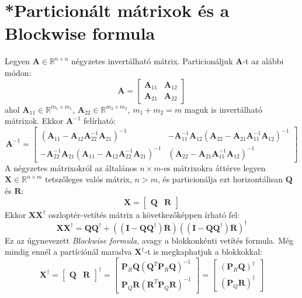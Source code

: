 \documentclass[14p]{report}
\def\pmb{\boldsymbol}
\newcounter{x}
\newcounter{y}
\newcounter{z}
\begin{document}
	\section{*Particionált mátrixok és a Blockwise formula}
	Legyen $\pmb{A} \in \mathbb{R}^{n \times n}$ négyzetes invertálható mátrix. Particionáljuk $\pmb{A}$-t az alábbi módon:
	\[
		\pmb{A} =
		\begin{bmatrix}
		\pmb{A}_{11} & \pmb{A}_{12} \\
		\pmb{A}_{21} & \pmb{A}_{22}
		\end{bmatrix}
	\]
	ahol $\pmb{A}_{11} \in \mathbb{R}^{m_1 \times m_1}$, $\pmb{A}_{22} \in \mathbb{R}^{m_2 \times m_2}$, $m_1 + m_2 = m$ maguk is invertálható mátrixok. Ekkor $\pmb{A}^{-1}$ felírható:
	\[
		\pmb{A}^{-1} = 
		\begin{bmatrix}
		(\pmb{A}_{11}-\pmb{A}_{12}\pmb{A}_{22}^{-1}\pmb{A}_{21})^{-1} & -\pmb{A}_{11}^{-1}\pmb{A}_{12}(\pmb{A}_{22}-\pmb{A}_{21}\pmb{A}_{11}^{-1}\pmb{A}_{12})^{-1} \\
		-\pmb{A}_{22}^{-1}\pmb{A}_{21}(\pmb{A}_{11}-\pmb{A}_{12}\pmb{A}_{22}^{-1}\pmb{A}_{21})^{-1} & (\pmb{A}_{22}-\pmb{A}_{21}\pmb{A}_{11}^{-1}\pmb{A}_{12})^{-1}
		\end{bmatrix}
	\]
	A négyzetes mátrixokról az általános $n \times m$-es mátrixokra áttérve legyen $\pmb{X} \in \mathbb{R}^{n \times m}$ tetszőleges valós mátrix, $n > m$, és particionálja ezt horizontálisan $\pmb{Q}$ és $\pmb{R}$:
	\[
		\pmb{X} = \begin{bmatrix}
				\pmb{Q} & \pmb{R}
		\end{bmatrix}
	\]
	Ekkor $\pmb{X}\pmb{X}^{\dagger}$ oszloptér-vetítés mátrix a következőképpen írható fel:
	\[
		\pmb{X}\pmb{X}^{\dagger} = \pmb{Q}\pmb{Q}^{\dagger} + ((\pmb{I}-\pmb{Q}\pmb{Q}^{\dagger})\pmb{R})((\pmb{I}-\pmb{Q}\pmb{Q}^{\dagger})\pmb{R})^{\dagger}
	\]
	Ez az úgynevezett \emph{Blockwise formula}, avagy a blokkonkénti vetítés formula. Még mindig ennél a partíciónál maradva $\pmb{X}^{\dagger}$-t is megkaphatjuk a blokkokkal:
	\[
		\pmb{X}^{\dagger} = 
		\begin{bmatrix}
		\pmb{Q} & \pmb{R}
		\end{bmatrix}^{\dagger} =
	\begin{bmatrix}
	\pmb{P}_{R}\pmb{Q}(\pmb{Q}^T\pmb{P}_{R}\pmb{Q})^{-1} \\
	\pmb{P}_{Q}\pmb{R}(\pmb{R}^T\pmb{P}_{Q}\pmb{R})^{-1}
	\end{bmatrix} = 
	\begin{bmatrix}
	(\pmb{P}_{R}\pmb{Q})^{\dagger} \\
	(\pmb{P}_{Q}\pmb{R})^{\dagger}
	\end{bmatrix}
	\]
\end{document}
